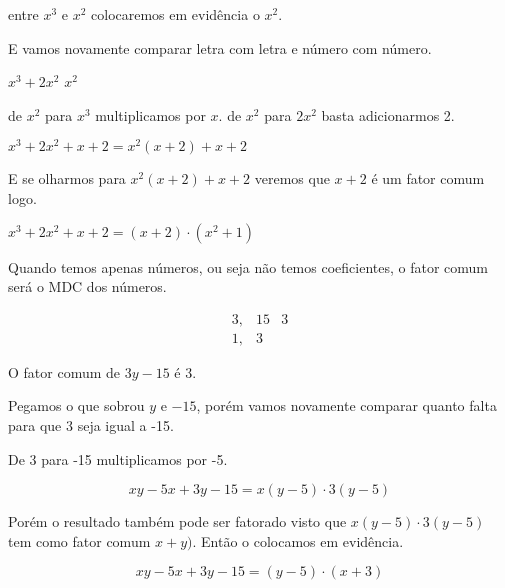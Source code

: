 \documentclass[letterpaper]{book}
\begin{document}
entre \(x^{3}\) e \(x^{2}\) colocaremos em evidência o \(x^{2}\).

E vamos novamente comparar letra com letra e número com número.

\(x^{3} + 2x^{2}\)
\(x^{2}\)

de \(x^{2}\) para \(x^{3}\) multiplicamos por \(x\).
de \(x^{2}\) para \(2x^{2}\) basta adicionarmos 2.

\(x^{3} + 2x^{2} + x + 2 = x^{2}(x + 2) + x + 2\)

E se olharmos para \(x^{2}(x + 2) + x + 2\) veremos que \(x+2\) é um fator comum logo.

\(x^{3} + 2x^{2} + x + 2 = (x + 2) \cdot (x^{2} + 1)\)

Quando temos apenas números, ou seja não temos coeficientes, o fator comum será o MDC dos números.

\[
\begin{array}{cc|cc}
3, & 15 & 3 \\
1, & 3 
\end{array}
\]

O fator comum de \(3y - 15\) é $3$.

Pegamos o que sobrou \(y\) e $-15$, porém vamos novamente comparar quanto falta para que 3 seja igual a -15.

De 3 para -15 multiplicamos por -5.

\[xy - 5x + 3y - 15 = x(y - 5) \cdot 3(y -5)\]

Porém o resultado também pode ser fatorado visto que \(x(y - 5) \cdot 3(y -5)\) tem como fator comum \(x+y)\). Então o colocamos em evidência.

\[xy - 5x + 3y - 15 = (y - 5) \cdot (x + 3)\]
\end{document}
